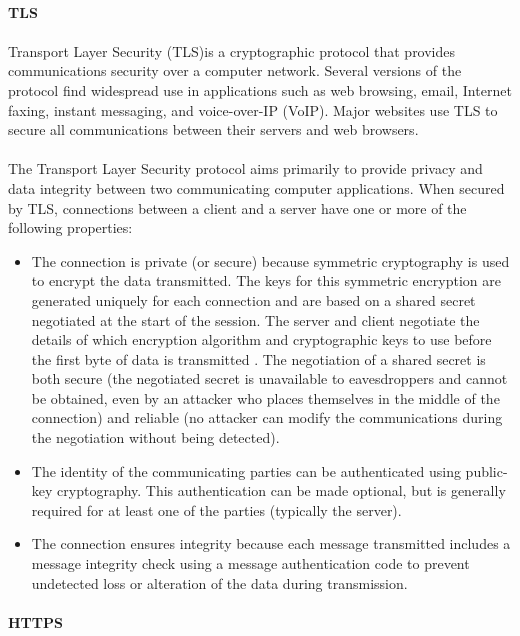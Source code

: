 \paragraph{} \textbf{TLS}
\paragraph{}
Transport Layer Security (TLS)is a cryptographic protocol that provides communications security over a computer network. Several versions of the protocol find widespread use in applications such as web browsing, email, Internet faxing, instant messaging, and voice-over-IP (VoIP). Major websites use TLS to secure all communications between their servers and web browsers.
\paragraph{}
The Transport Layer Security protocol aims primarily to provide privacy and data integrity between two communicating computer applications. When secured by TLS, connections between a client  and a server have one or more of the following properties:
\begin{itemize}
\item The connection is private (or secure) because symmetric cryptography is used to encrypt the data transmitted. The keys for this symmetric encryption are generated uniquely for each connection and are based on a shared secret negotiated at the start of the session. The server and client negotiate the details of which encryption algorithm and cryptographic keys to use before the first byte of data is transmitted . The negotiation of a shared secret is both secure (the negotiated secret is unavailable to eavesdroppers and cannot be obtained, even by an attacker who places themselves in the middle of the connection) and reliable (no attacker can modify the communications during the negotiation without being detected).
\item The identity of the communicating parties can be authenticated using public-key cryptography. This authentication can be made optional, but is generally required for at least one of the parties (typically the server).
\item The connection ensures integrity because each message transmitted includes a message integrity check using a message authentication code to prevent undetected loss or alteration of the data during transmission.
\end{itemize}

\paragraph{}\textbf{HTTPS}
